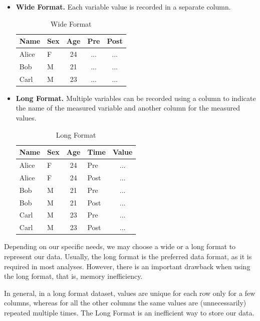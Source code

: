 \documentclass[
  11pt,
]{book}
\providecommand{\tightlist}{%
  \setlength{\itemsep}{0pt}\setlength{\parskip}{0pt}}
\begin{document}
\begin{itemize}
\tightlist
\item
  \textbf{Wide Format.} Each variable value is recorded in a separate column.

  \begin{table}[!h]

    \caption{\label{tab:unnamed-chunk-16}Wide Format}
    \centering
    \begin{tabular}[t]{llccc}
    \toprule
    Name & Sex & Age & Pre & Post\\
    \midrule
    Alice & F & 24 & ... & ...\\
    Bob & M & 21 & ... & ...\\
    Carl & M & 23 & ... & ...\\
    \bottomrule
    \end{tabular}
    \end{table}
\item
  \textbf{Long Format.} Multiple variables can be recorded using a column to indicate the name of the measured variable and another column for the measured values.

  \begin{table}[!h]

    \caption{\label{tab:unnamed-chunk-17}Long Format}
    \centering
    \begin{tabular}[t]{llclc}
    \toprule
    Name & Sex & Age & Time & Value\\
    \midrule
    Alice & F & 24 & Pre & ...\\
    Alice & F & 24 & Post & ...\\
    Bob & M & 21 & Pre & ...\\
    Bob & M & 21 & Post & ...\\
    Carl & M & 23 & Pre & ...\\
    \addlinespace
    Carl & M & 23 & Post & ...\\
    \bottomrule
    \end{tabular}
    \end{table}
\end{itemize}

Depending on our specific needs, we may choose a wide or a long format to represent our data. Usually, the long format is the preferred data format, as it is required in most analyses. However, there is an important drawback when using the long format, that is, memory inefficiency.

In general, in a long format dataset, values are unique for each row only for a few columns, whereas for all the other columns the same values are (unnecessarily) repeated multiple times. The Long Format is an inefficient way to store our data.
\end{document}
